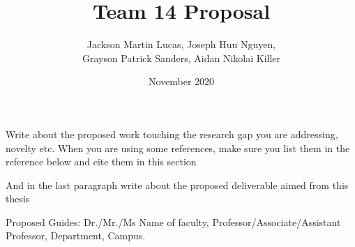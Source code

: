 \documentclass[12pt]{extarticle}
\title{Team 14 Proposal}
\author{Jackson Martin Lucas, Joseph Huu Nguyen, \\Grayson Patrick Sanders, Aidan Nikolai Killer}
\date{November 2020}
\begin{document}
\maketitle

Write about the proposed work touching the research gap you are addressing, novelty etc. When you are using some references, make sure you list them in the reference below and cite them in this section

And in the last paragraph write about the proposed deliverable aimed from this thesis

Proposed Guides: Dr./Mr./Ms Name of faculty, Professor/Associate/Assistant Professor, Department, Campus.  


%
%
\end{document}
